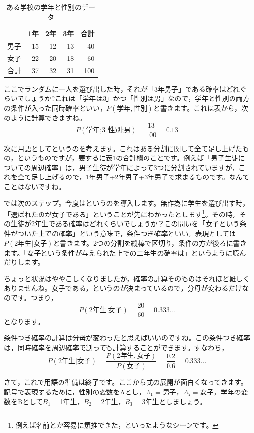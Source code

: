 \documentclass{ltjsarticle}
\begin{document}
\begin{table}[ht]
    \centering
    \caption{ある学校の学年と性別のデータ} 
    \begin{tabular}{rrrrr}
      \hline
      & 1年 & 2年 & 3年 & 合計 \\
    \hline
    男子 & 15 & 12 & 13 & 40\\
    女子 & 22 & 20 & 18 & 60\\\hline
    合計 & 37 & 32 & 31 & 100\\\hline
    \end{tabular}
      \label{tbl::24_02}
\end{table}

ここでランダムに一人を選び出した時，それが「3年男子」である確率はどれぐらいでしょうか?これは「学年は3」かつ「性別は男」なので，学年と性別の両方の条件が入った同時確率といい，$P(\mbox{学年},\mbox{性別})$と書きます。これは表から，次のように計算できますね。
$$ P(\mbox{学年;3},\mbox{性別;男})= \frac{13}{100}=0.13$$

次に用語としてというのを考えます。これはある分割に関して全て足し上げたもの，というものですが，要するに表\ref{tbl::24_02}の合計欄のことです。例えば「男子生徒についての周辺確率」は，男子生徒が学年によって3つに分割されていますが，これを全て足し上げるので，1年男子+2年男子+3年男子で求まるものです。なんてことはないですね。

では次のステップ。今度はというのを導入します。無作為に学生を選び出す時，「選ばれたのが女子である」ということが先にわかったとします\footnote{例えば名前とか容易に類推できた，といったようなシーンです。}。その時，その生徒が2年生である確率はどれくらいでしょうか？この問いを「女子という条件がついた上での確率」という意味で，条件つき確率といい，表現としては$P(\mbox{2年生}|\mbox{女子})$と書きます。2つの分割を縦棒で区切り，条件の方が後ろに書きます。「女子という条件が与えられた上での二年生の確率は」というように読んだりします。

ちょっと状況はややこしくなりましたが，確率の計算そのものはそれほど難しくありませんね。女子である，というのが決まっているので，分母が変わるだけなのです。つまり，
$$P(\mbox{2年生}|\mbox{女子})=\frac{20}{60}=0.333...$$
となります。

条件つき確率の計算は分母が変わったと思えばいいのですね。この条件つき確率は，同時確率を周辺確率で割っても計算することができます。すなわち，
$$ P(\mbox{2年生}|\mbox{女子}) = \frac{P(\mbox{2年生},\mbox{女子})}{P(\mbox{女子})}=\frac{0.2}{0.6}=0.333...$$

さて，これで用語の準備は終了です。ここから式の展開が面白くなってきます。記号で表現するために，性別の変数をAとし，$A_1=$男子，$A_2=$女子，学年の変数をBとして$B_1=$1年生，$B_2=$2年生，$B_3=$3年生としましょう。
\end{document}
